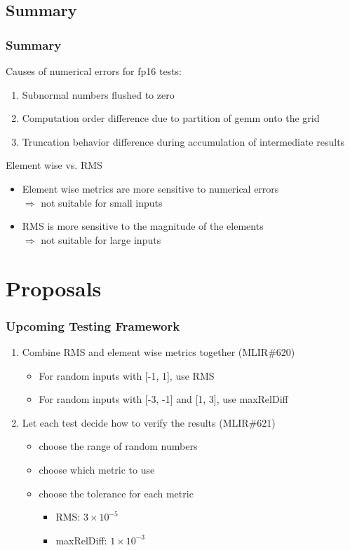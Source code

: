 \documentclass[t, pdftex, aspectratio=169]{beamer}  %
\begin{document}
\subsection{Summary}
\begin{frame}
  \frametitle{Summary}

  Causes of numerical errors for fp16 tests:
  \begin{enumerate}
  \item Subnormal numbers flushed to zero
  \item Computation order difference due to partition of gemm onto the grid
  \item Truncation behavior difference during accumulation of intermediate results
  \end{enumerate}

  { Element wise vs. RMS
    \begin{itemize}
    \item Element wise metrics are more sensitive to numerical errors\\
      $\Rightarrow$ not suitable for small inputs
    \item RMS is more sensitive to the magnitude of the elements\\
      $\Rightarrow$ not suitable for large inputs
    \end{itemize}}
\end{frame}

\section{Proposals}
\begin{frame}
  \frametitle{Upcoming Testing Framework}
  \begin{enumerate}
  \item Combine RMS and element wise metrics together (MLIR\#620)
    \begin{itemize}
    \item For random inputs with [-1, 1], use RMS
    \item For random inputs with [-3, -1] and [1, 3], use maxRelDiff
    \end{itemize}
  \item Let each test decide how to verify the results (MLIR\#621)
    \begin{itemize}
    \item choose the range of random numbers
    \item choose which metric to use
    \item choose the tolerance for each metric
      \begin{itemize}
      \item RMS: $3\times10^{-5}$
      \item maxRelDiff: $1\times10^{-3}$
      \end{itemize}
    \end{itemize}
  \end{enumerate}
\end{frame}
\end{document}
